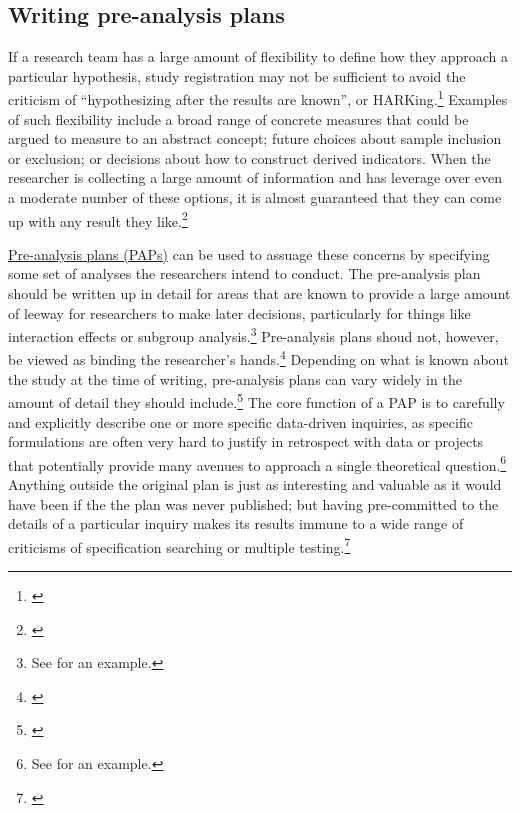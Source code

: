 \documentclass[]{tufte-book}
\begin{document}
\hypertarget{writing-pre-analysis-plans}{%
\subsection*{Writing pre-analysis
plans}\label{writing-pre-analysis-plans}}

If a research team has a large amount of flexibility to define how they
approach a particular hypothesis, study registration may not be
sufficient to avoid the criticism of ``hypothesizing after the results
are known'', or HARKing.\footnote{\cite{@kerr1998harking}} Examples of
such flexibility include a broad range of concrete measures that could
be argued to measure to an abstract concept; future choices about sample
inclusion or exclusion; or decisions about how to construct derived
indicators. When the researcher is collecting a large amount of
information and has leverage over even a moderate number of these
options, it is almost guaranteed that they can come up with any result
they like.\footnote{\cite{@gelman2013garden}}

\href{https://dimewiki.worldbank.org/Pre-Analysis_Plan}{Pre-analysis
plans (PAPs)} can be used to assuage these
concerns by specifying some set of analyses the researchers intend to
conduct. The pre-analysis plan should be written up in detail for areas
that are known to provide a large amount of leeway for researchers to
make later decisions, particularly for things like interaction effects
or subgroup analysis.\footnote{See \cite{@cusolito2018can} for an
  example.} Pre-analysis plans shoud not, however, be viewed as binding
the researcher's hands.\footnote{\cite{@olken2015promises}} Depending on
what is known about the study at the time of writing, pre-analysis plans
can vary widely in the amount of detail they should include.\footnote{\href{https://blogs.worldbank.org/impactevaluations/pre-analysis-plans-and-registered-reports-what-new-opinion-piece-does-and-doesnt}{}}
The core function of a PAP is to carefully and explicitly describe one
or more specific data-driven inquiries, as specific formulations are
often very hard to justify in retrospect with data or projects that
potentially provide many avenues to approach a single theoretical
question.\footnote{See \cite{@bedoya2019no} for an example.} Anything
outside the original plan is just as interesting and valuable as it
would have been if the the plan was never published; but having
pre-committed to the details of a particular inquiry makes its results
immune to a wide range of criticisms of specification searching or
multiple testing.\footnote{\cite{@duflo2020praise}}
\end{document}
